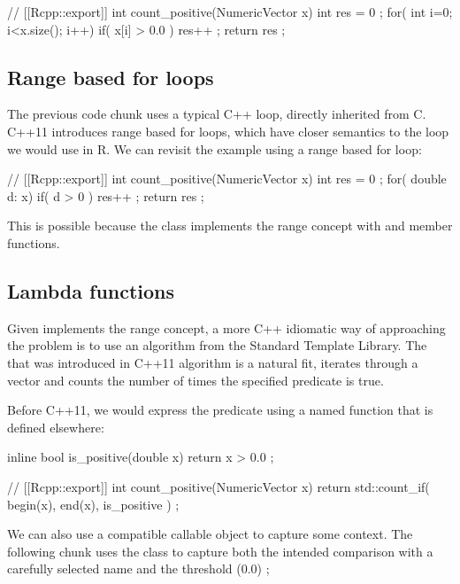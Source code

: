 \begin{example}
// [[Rcpp::export]]
int count_positive(NumericVector x){
  int res = 0 ;
  for( int i=0; i<x.size(); i++){
    if( x[i] > 0.0 ) res++ ;
  }
  return res ;
}
\end{example}

\subsection{Range based for loops}

The previous code chunk uses a typical C++  loop, directly 
inherited from C. C++11 introduces range based for loops, which have 
closer semantics to the loop we would use in R. We can revisit the 
example using a range based for loop:

\begin{example}
// [[Rcpp::export]]
int count_positive(NumericVector x){
  int res = 0 ;
  for( double d: x){
    if( d > 0 ) res++ ;
  }
  return res ;
}
\end{example}

This is possible because the  class implements 
the range concept with  and  member functions. 

\subsection{Lambda functions}

Given  implements the range concept, a more C++ idiomatic
way of approaching the problem is to use an algorithm from the Standard
Template Library. The  that was introduced
in C++11 algorithm is a natural fit,  iterates through a vector
and counts the number of times the specified predicate is true. 

Before C++11, we would express the predicate using a named function that is defined
elsewhere: 

\begin{example}
inline bool is_positive(double x){
  return x > 0.0 ;
}

// [[Rcpp::export]]
int count_positive(NumericVector x){
  return std::count_if( begin(x), end(x), is_positive ) ;
}
\end{example}

We can also use a compatible callable object to capture some context. The 
following chunk uses the  class to capture both the 
intended comparison with a carefully selected name and the threshold (0.0) ;

